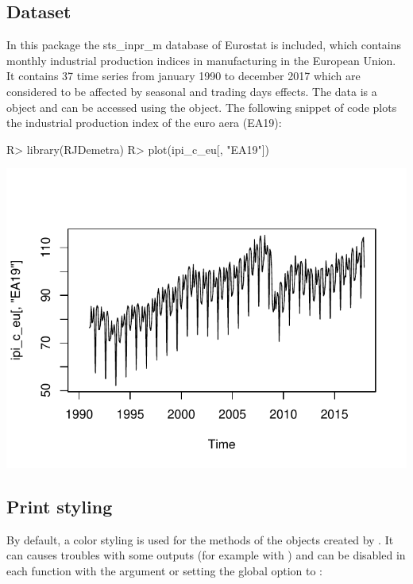\documentclass[article]{jss}
\begin{document}
\hypertarget{dataset}{%
\subsection{Dataset}\label{dataset}}

In this package the sts\_inpr\_m database of Eurostat is included, which
contains monthly industrial production indices in manufacturing in the
European Union. It contains 37 time series from january 1990 to december
2017 which are considered to be affected by seasonal and trading days
effects. The data is a  object and can be accessed using the
 object. The following snippet of code plots the
industrial production index of the euro aera (EA19):

\begin{CodeChunk}

\begin{CodeInput}
R> library(RJDemetra)
R> plot(ipi_c_eu[, "EA19"])
\end{CodeInput}


\begin{center}\includegraphics{img/img-basic_raw_data_plot-1} \end{center}

\end{CodeChunk}

\hypertarget{print-styling}{%
\subsection{Print styling}\label{print-styling}}

By default, a color styling is used for the  methods of the
objects created by . It can causes troubles with some
outputs (for example with  \citep{rmarkdown}) and can be
disabled in each  function with the argument
 or setting the global option
 to :
\end{document}
